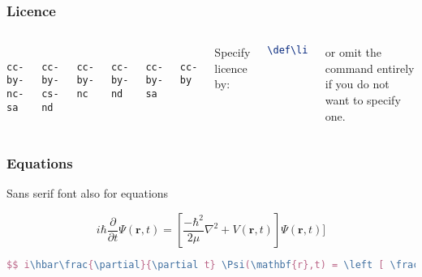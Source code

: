 \documentclass[handout,aspectratio=169]{beamer}
\def\licence{cc-by-nc-sa}
\begin{document}

\begin{frame}[fragile]
    \frametitle{Licence}

    \begin{columns}
        \centering

         \\ {\tt cc-by-nc-sa}

        \vspace{3pt} \\ {\tt cc-by-cs-nd}

        \vspace{3pt} \\ {\tt cc-by-nc}

        \centering

         \\ {\tt cc-by-nd}

        \vspace{3pt} \\ {\tt cc-by-sa}

        \vspace{3pt} \\ {\tt cc-by}

        Specify licence by:
\begin{lstlisting}[language=TeX]
\def\licence{cc-by-nc-sa}
\end{lstlisting}

    or omit the command entirely if you do not want to specify one.

    \end{columns}


\end{frame}


\begin{frame}[fragile]
    \frametitle{Equations}

    \centering Sans serif font also for equations

    $$i\hbar\frac{\partial}{\partial t} \Psi(\mathbf{r},t) = \left [ \frac{-\hbar^2}{2\mu}\nabla^2 + V(\mathbf{r},t)\right ] \Psi(\mathbf{r},t) ]$$

    \begin{lstlisting}[language=TeX]
$$ i\hbar\frac{\partial}{\partial t} \Psi(\mathbf{r},t) = \left [ \frac{-\hbar^2}{2\mu}\nabla^2 + V(\mathbf{r},t)\right ] \Psi(\mathbf{r},t) ]$$
    \end{lstlisting}

\end{frame}
\end{document}
